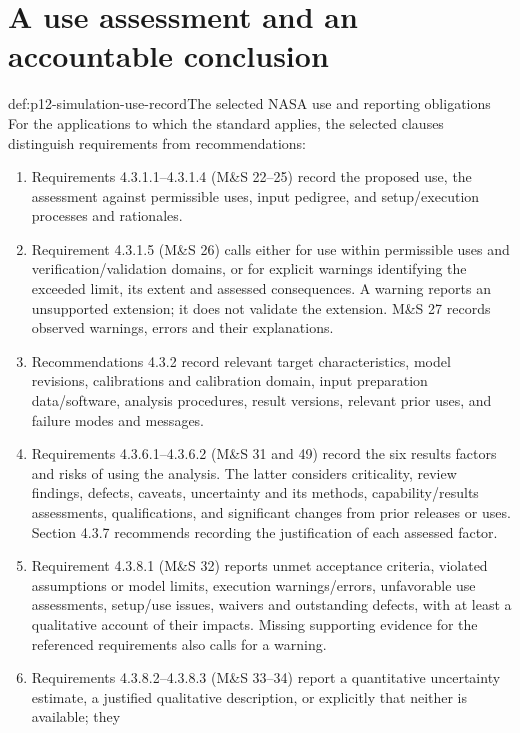 \section{A use assessment and an accountable conclusion}

\begin{hbmethod}{def:p12-simulation-use-record}{The selected NASA use and reporting obligations}
For the applications to which the standard applies, the selected
clauses distinguish requirements from recommendations:
\begin{enumerate}
\item Requirements 4.3.1.1--4.3.1.4 (M\&S 22--25) record the
      proposed use, the assessment against permissible uses, input
      pedigree, and setup/execution processes and rationales.
\item Requirement 4.3.1.5 (M\&S 26) calls either for use within
      permissible uses and verification/validation domains, or for
      explicit warnings identifying the exceeded limit, its extent
      and assessed consequences. A warning reports an unsupported
      extension; it does not validate the extension. M\&S 27
      records observed warnings, errors and their explanations.
\item Recommendations 4.3.2 record relevant target characteristics,
      model revisions, calibrations and calibration domain, input
      preparation data/software, analysis procedures, result versions,
      relevant prior uses, and failure modes and messages.
\item Requirements 4.3.6.1--4.3.6.2 (M\&S 31 and 49) record the
      six results factors and risks of using the analysis. The latter
      considers criticality, review findings, defects, caveats,
      uncertainty and its methods, capability/results assessments,
      qualifications, and significant changes from prior releases
      or uses. Section 4.3.7 recommends recording the justification
      of each assessed factor.
\item Requirement 4.3.8.1 (M\&S 32) reports unmet acceptance
      criteria, violated assumptions or model limits, execution
      warnings/errors, unfavorable use assessments, setup/use
      issues, waivers and outstanding defects, with at least a
      qualitative account of their impacts. Missing supporting
      evidence for the referenced requirements also calls for a warning.
\item Requirements 4.3.8.2--4.3.8.3 (M\&S 33--34) report a
      quantitative uncertainty estimate, a justified qualitative
      description, or explicitly that neither is available; they

\end{enumerate}
\end{hbmethod}
